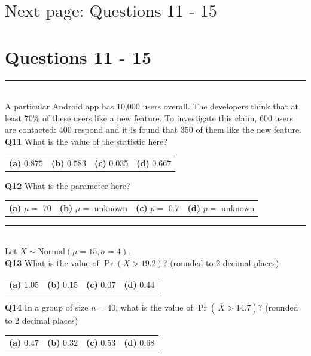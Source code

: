 \documentclass[12pt]{article}
\begin{document}
\section*{\hspace{8cm}$\boxed{\text{Next page: Questions 11 - 15}}$}

\newpage

\section*{Questions 11 - 15}


\rule{\linewidth}{1pt}
\quad\\
A particular Android app has 10,000 users overall. The developers think that at least 70\% of these users like a new feature. To investigate this claim, 600 users are contacted: 400 \mbox{respond} and it is found that 350 of them like the new feature.
\\[0.2cm]

{\bf Q11} What is the value of the statistic here?\\[0.2cm]
\begin{tabular}{cccc}
{\bf(a)} $0.875$ & {\bf(b)} $0.583$ & {\bf(c)} 0.035 & {\bf(d)} $0.667$ \\[0.6cm]
\end{tabular}

{\bf Q12} What is the parameter here? \\[0.2cm]
\begin{tabular}{cccc}
{\bf(a)} $\mu=$ 70 & {\bf(b)} $\mu=$ unknown & {\bf(c)}  $p=$ 0.7 & {\bf(d)} $p=$ unknown \\[0.6cm]
\end{tabular}


\rule{\linewidth}{1pt}
\quad\\
Let $X \sim \text{Normal}(\mu=15,\sigma=4)$.\\[0.2cm]

{\bf Q13} What is the value of $\Pr(X > 19.2)$? {\footnotesize(rounded to 2 decimal places)}\\[0.2cm]
\begin{tabular}{cccc}
{\bf(a)} $1.05$ & {\bf(b)} $0.15$ & {\bf(c)} $0.07$ & {\bf(d)} $0.44$ \\[0.6cm]
\end{tabular}


{\bf Q14} In a group of size $n=40$, what is the value of $\Pr(\,\overline{\!X} > 14.7)$? {\footnotesize(rounded to 2 decimal places)}\\[0.2cm]
\begin{tabular}{cccc}
{\bf(a)} $0.47$ & {\bf(b)} $0.32$ & {\bf(c)} $0.53$ & {\bf(d)} $0.68$  \\[0.6cm]
\end{tabular}
\end{document}
